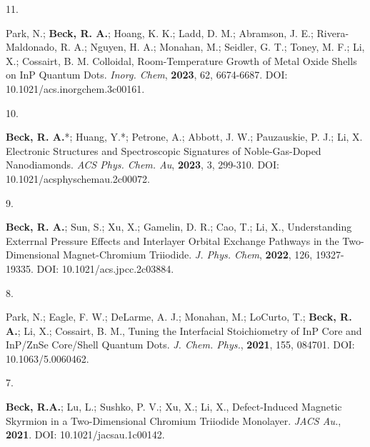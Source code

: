 \begin{cvpublications}


\cvpublication
{11.}
{\parbox[t]{0.95\textwidth}{\strut Park, N.; \textbf{Beck, R. A.}; Hoang, K. K.; Ladd, D. M.; Abramson, J. E.; Rivera-Maldonado, R. A.; Nguyen, H. A.; Monahan, M.; Seidler, G. T.; Toney, M. F.; Li, X.; Cossairt, B. M.
Colloidal, Room-Temperature Growth of Metal Oxide Shells on InP Quantum Dots.
\textit{Inorg. Chem}, \textbf{2023}, 62, 6674-6687.
DOI: 10.1021/acs.inorgchem.3c00161.}}



\cvpublication
{10.}
{\parbox[t]{0.95\textwidth}{\strut \textbf{Beck, R. A.}*; Huang, Y.*; Petrone, A.; Abbott, J. W.; Pauzauskie, P. J.; Li, X.
Electronic Structures and Spectroscopic Signatures of Noble-Gas-Doped Nanodiamonds.
\textit{ACS Phys. Chem. Au}, \textbf{2023}, 3, 299-310.
DOI: 10.1021/acsphyschemau.2c00072.}}



\cvpublication
{9.}
{\parbox[t]{0.95\textwidth}{\strut \textbf{Beck, R. A.}; Sun, S.; Xu, X.; Gamelin, D. R.; Cao, T.; Li, X.,
Understanding Exterrnal Pressure Effects and Interlayer Orbital Exchange Pathways in the Two-Dimensional Magnet-Chromium Triiodide.
\textit{J. Phys. Chem}, \textbf{2022}, 126, 19327-19335.
DOI: 10.1021/acs.jpcc.2c03884.}}



\cvpublication
{8.}
{\parbox[t]{0.95\textwidth}{\strut Park, N.; Eagle, F. W.; DeLarme, A. J.; Monahan, M.; LoCurto, T.; \textbf{Beck, R. A.}; Li, X.; Cossairt, B. M.,
Tuning the Interfacial Stoichiometry of InP Core and InP/ZnSe Core/Shell Quantum Dots.
\textit{J. Chem. Phys.}, \textbf{2021}, 155, 084701.
DOI: 10.1063/5.0060462.}}




\cvpublication
{7.}
{\parbox[t]{0.95\textwidth}{\strut \textbf{Beck, R.A.}; Lu, L.; Sushko, P. V.; Xu, X.; Li, X.,
Defect-Induced Magnetic Skyrmion in a Two-Dimensional Chromium Triiodide Monolayer.
\textit{JACS Au.}, \textbf{2021}. 
DOI: 10.1021/jacsau.1c00142.}}


\end{cvpublications}
